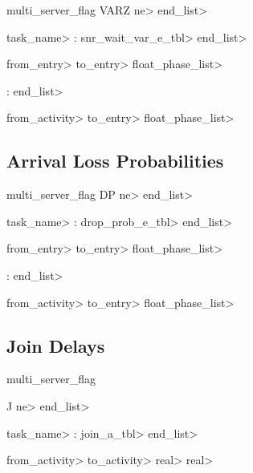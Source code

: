 \begin{bnf}{multi\_server\_flag}
   VARZ \<ne>  \<end\_list>

   \<task\_name> : \<snr\_wait\_var\_e\_tbl> \<end\_list> 

   

   \<from\_entry> \<to\_entry> \<float\_phase\_list>

   :  \<end\_list>

   \<from\_activity> \<to\_entry> \<float\_phase\_list>
\end{bnf}

\subsection{Arrival Loss Probabilities}
\label{sec:arrival-loss-p}

\begin{bnf}{multi\_server\_flag}
   DP \<ne>  \<end\_list>

   \<task\_name> : \<drop\_prob\_e\_tbl> \<end\_list> 

   

   \<from\_entry> \<to\_entry> \<float\_phase\_list>

   :  \<end\_list>

   \<from\_activity> \<to\_entry> \<float\_phase\_list>

\end{bnf}

\subsection{Join Delays}
\label{sec:join-delay-p}

\begin{bnf}{multi\_server\_flag}

   J \<ne>  \<end\_list>

   \<task\_name> : \<join\_a\_tbl> \<end\_list>

   

   \<from\_activity> \<to\_activity> \<real>
  \<real>
\end{bnf}


